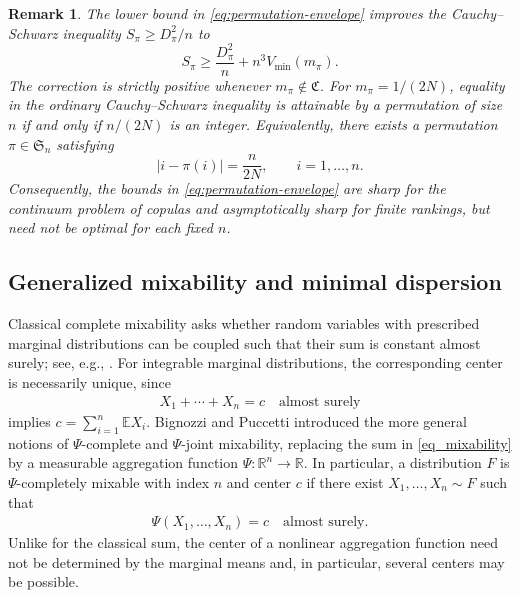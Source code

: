 \documentclass{article}
\newtheorem{remark}[theorem]{Remark}
\newcommand{\E}{\mathbb{E}}
\newcommand{\R}{\mathbb{R}}
\begin{document}
\begin{remark}
    The lower bound in \eqref{eq:permutation-envelope} improves the Cauchy--Schwarz inequality \(S_\pi\geq D_\pi^2/n\) to
    \begin{equation}\label{eq:improved-cauchy-schwarz}
        S_\pi
        \geq
        \frac{D_\pi^2}{n}
        +
        n^3V_{\operatorname{min}}(m_\pi).
    \end{equation}
    The correction is strictly positive whenever \(m_\pi\notin\mathfrak C\).
    For \(m_\pi=1/(2N)\), equality in the ordinary Cauchy--Schwarz inequality is attainable by a permutation of size \(n\) if and only if \(n/(2N)\) is an integer.
    Equivalently, there exists a permutation \(\pi\in\mathfrak S_n\) satisfying
\[
    |i-\pi(i)|=\frac{n}{2N},
    \qquad i=1,\ldots,n.
\]
Consequently, the bounds in \eqref{eq:permutation-envelope} are sharp for the continuum problem of copulas and asymptotically sharp for finite rankings, but need not be optimal for each fixed \(n\).
\end{remark}



\subsection{Generalized mixability and minimal dispersion}\label{sec:mixability}

Classical complete mixability asks whether random variables with prescribed marginal distributions can be coupled such that their sum is constant almost surely; see, e.g., \cite{wang2015current}.
For integrable marginal distributions, the corresponding center is necessarily unique, since
\begin{align}\label{eq_mixability}
    X_1+\cdots+X_n=c \quad \text{almost surely}
\end{align}
implies \(c=\sum_{i=1}^n \E X_i.\) Bignozzi and Puccetti \cite{bignozzi2015studying} introduced the more general notions of \(\Psi\)-complete and \(\Psi\)-joint mixability, replacing the sum in \eqref{eq_mixability} by a measurable aggregation function \(\Psi\colon\R^n\to\R\).
In particular, a distribution \(F\) is \(\Psi\)-completely mixable with index \(n\) and center \(c\) if there exist \(X_1,\ldots,X_n\sim F\) such that
\begin{align*}
    \Psi(X_1,\ldots,X_n)=c
    \quad\text{almost surely}.
\end{align*}
Unlike for the classical sum, the center of a nonlinear aggregation function need not be determined by the marginal means and, in particular, several centers may be possible.
\end{document}
